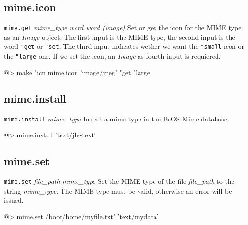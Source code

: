 \cbstart
\subsection*{mime.icon} 

{\tt mime.get} {\it mime\_type word word (image)}
\newline\newline
Set or get the icon for the MIME type as an {\it Image} object. The first input is the MIME type, the second input is the word {\tt "get} or {\tt "set}. The third input indicates wether we want the {\tt "small} icon or the {\tt "large} one. If we set the icon, an {\it Image} as fourth input is requiered. 
\begin{verbatimtab}
@> make "icn mime.icon 'image/jpeg' "get "large
\end{verbatimtab}
\cbend

\subsection*{mime.install} 

{\tt mime.install} {\it mime\_type}
\newline\newline
Install a mime type in the BeOS Mime database.
\begin{verbatimtab}
@> mime.install 'text/jlv-text'
\end{verbatimtab}

\subsection*{mime.set} 

{\tt mime.set} {\it file\_path mime\_type}
\newline\newline
Set the MIME type of the file {\it file\_path} to the string {\it mime\_type}. The MIME type must be valid, otherwise an error will be issued.
\begin{verbatimtab}
@> mime.set /boot/home/myfile.txt' 'text/mydata'
\end{verbatimtab}
